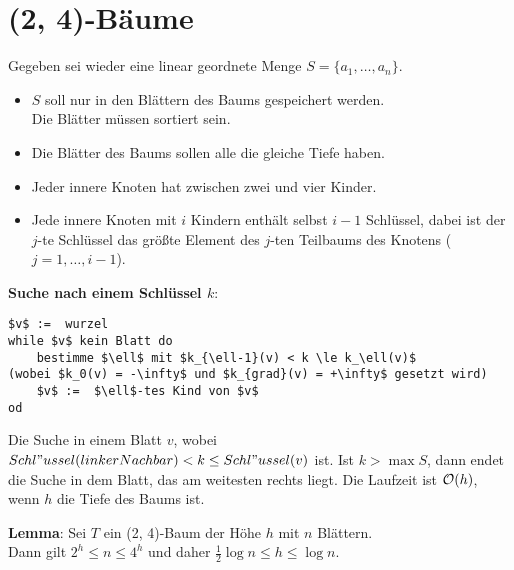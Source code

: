 \section{%
    (2, 4)-Bäume
}

Gegeben sei wieder eine linear geordnete Menge $S = \{a_1, \dotsc, a_n\}$.
\begin{itemize}
    \item
    $S$ soll nur in den Blättern des Baums gespeichert werden. \\
    Die Blätter müssen sortiert sein.

    \item
    Die Blätter des Baums sollen alle die gleiche Tiefe haben.

    \item
    Jeder innere Knoten hat zwischen zwei und vier Kinder.

    \item
    Jede innere Knoten mit $i$ Kindern enthält selbst $i - 1$ Schlüssel,
    dabei ist der $j$-te Schlüssel das größte Element des $j$-ten Teilbaums
    des Knotens ($j = 1, \dotsc, i - 1$).
\end{itemize}

\linie

\textbf{Suche nach einem Schlüssel $k$}:
\begin{lstlisting}
$v$ :=  wurzel
while $v$ kein Blatt do
    bestimme $\ell$ mit $k_{\ell-1}(v) < k \le k_\ell(v)$                              (wobei $k_0(v) = -\infty$ und $k_{grad}(v) = +\infty$ gesetzt wird)
    $v$ :=  $\ell$-tes Kind von $v$
od
\end{lstlisting}

Die Suche in einem Blatt $v$, wobei
$Schl"ussel(linkerNachbar) < k \le Schl"ussel(v)$ ist.
Ist $k > \max S$, dann endet die Suche in dem Blatt, das am weitesten rechts
liegt.
Die Laufzeit ist $\mathcal{O}(h)$, wenn $h$ die Tiefe des Baums ist.

\pagebreak

\textbf{Lemma}: Sei $T$ ein (2, 4)-Baum der Höhe $h$ mit $n$ Blättern. \\
Dann gilt $2^h \le n \le 4^h$ und daher $\frac{1}{2} \log n \le h \le \log n$.

\linie


